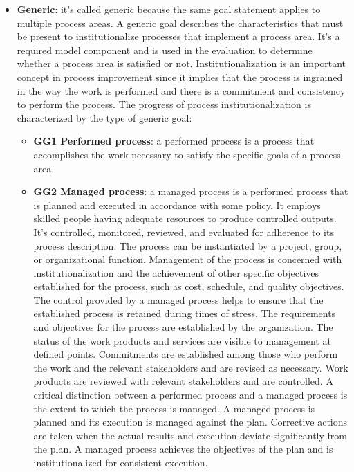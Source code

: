 \begin{itemize}
      \item \textbf{Generic}: it's called generic because the same goal statement applies to multiple process areas. A generic goal describes the characteristics that must be present to institutionalize processes that implement a process area. It's a required model component and is used in the evaluation to determine whether a process area is satisfied or not. Institutionalization is an important concept in process improvement since it implies that the process is ingrained in the way the work is performed and there is a commitment and consistency to perform the process. The progress of process institutionalization is characterized by the type of generic goal:
            \begin{itemize}
                  \item \textbf{GG1 \- Performed process}: a performed process is a process that accomplishes the work necessary to satisfy the specific goals of a process area.
                  \item \textbf{GG2 \- Managed process}: a managed process is a performed process that is planned and executed in accordance with some policy. It employs skilled people having adequate resources to produce controlled outputs. It's controlled, monitored, reviewed, and evaluated for adherence to its process description. The process can be instantiated by a project, group, or organizational function. Management of the process is concerned with institutionalization and the achievement of other specific objectives established for the process, such as cost, schedule, and quality objectives. The control provided by a managed process helps to ensure that the established process is retained during times of stress. The requirements and objectives for the process are established by the organization. The status of the work products and services are visible to management at defined points. Commitments are established among those who perform the work and the relevant stakeholders and are revised as necessary. Work products are reviewed with relevant stakeholders and are controlled. A critical distinction between a performed process and a managed process is the extent to which the process is managed. A managed process is planned and its execution is managed against the plan. Corrective actions are taken when the actual results and execution deviate significantly from the plan. A managed process achieves the objectives of the plan and is institutionalized for consistent execution.

\end{itemize}
\end{itemize}
